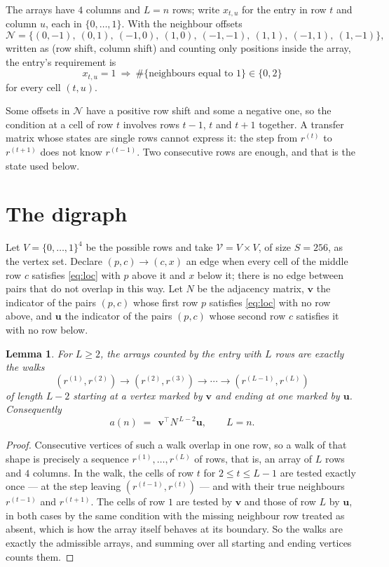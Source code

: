 \documentclass[11pt,a4paper]{article}
\theoremstyle{plain}
\newtheorem{lemma}[theorem]{Lemma}
\theoremstyle{definition}
\begin{document}
The arrays have $4$ columns and $L=n$ rows; write $x_{t,u}$ for the entry in
row $t$ and column $u$, each in $\{0,\dots,1\}$. With the neighbour offsets
\[
\mathcal N=\{(0,-1),\ (0,1),\ (-1,0),\ (1,0),\ (-1,-1),\ (1,1),\ (-1,1),\ (1,-1)\},
\]
written as (row shift, column shift) and counting only positions inside the array, the
entry's requirement is
\begin{equation}\label{eq:loc}
x_{t,u}=1\ \Rightarrow\ \#\{\text{neighbours equal to }1\}\in\{0,2\}
\end{equation}
for every cell $(t,u)$.

Some offsets in $\mathcal N$ have a positive row shift and some a negative one, so the
condition at a cell of row $t$ involves rows $t-1$, $t$ and $t+1$ together. A transfer
matrix whose states are single rows cannot express it: the step from $r^{(t)}$ to
$r^{(t+1)}$ does not know $r^{(t-1)}$. Two consecutive rows are enough, and that is
the state used below.

\section{The digraph}

Let $V=\{0,\dots,1\}^{4}$ be the possible rows and take
$\mathcal V=V\times V$, of size $S=256$, as the vertex set. Declare $(p,c)\to(c,x)$ an edge
when every cell of the middle row $c$ satisfies \eqref{eq:loc} with $p$ above it and $x$
below it; there is no edge between pairs that do not overlap in this way. Let $N$ be the
adjacency matrix, $\mathbf{v}$ the indicator of the pairs $(p,c)$ whose first row $p$
satisfies \eqref{eq:loc} with no row above, and $\mathbf{u}$ the indicator of
the pairs $(p,c)$ whose second row $c$ satisfies it with no row below.

\begin{lemma}\label{lem:walk}
For $L\ge2$, the arrays counted by the entry with $L$ rows are exactly the walks
\[
(r^{(1)},r^{(2)})\to(r^{(2)},r^{(3)})\to\cdots\to(r^{(L-1)},r^{(L)})
\]
of length $L-2$ starting at a vertex marked by $\mathbf{v}$ and ending at one marked by
$\mathbf{u}$. Consequently
\[
a(n)\;=\;\,\mathbf{v}^{\!\top}N^{\,L-2}\mathbf{u},\qquad L=n .
\]
\end{lemma}

\begin{proof}
Consecutive vertices of such a walk overlap in one row, so a walk of that shape is
precisely a sequence $r^{(1)},\dots,r^{(L)}$ of rows, that is, an array of $L$ rows
and $4$ columns. In the walk, the cells of row $t$ for $2\le t\le L-1$ are tested
exactly once --- at the step leaving $(r^{(t-1)},r^{(t)})$ --- and with their true
neighbours $r^{(t-1)}$ and $r^{(t+1)}$. The cells of row $1$ are tested by
$\mathbf{v}$ and those of row $L$ by $\mathbf{u}$, in both cases by the same condition
with the missing neighbour row treated as absent, which is how the array itself behaves at
its boundary. So the walks are exactly the admissible arrays, and summing over all starting
and ending vertices counts them.
\end{proof}
\end{document}

